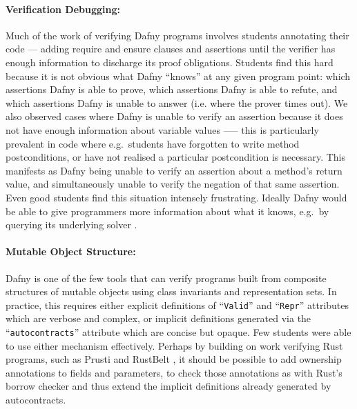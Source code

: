 \paragraph{Verification Debugging:}
Much of the work of verifying Dafny programs involves students
annotating their code --- adding require and ensure clauses and
assertions until the verifier has enough information to discharge its
proof obligations.  Students find this hard because it is not obvious
what Dafny “knows” at any given program point: which assertions Dafny
is able to prove, which assertions Dafny is able to refute, and which
assertions Dafny is unable to answer (i.e. where the prover times
out). We also observed cases where Dafny is unable to verify an
assertion because it does not have enough information about variable
values --— this is particularly prevalent in code where e.g.\ 
students have forgotten to write method postconditions, or 
have not realised a particular postcondition is necessary. This
manifests as Dafny being unable to verify an assertion about a
method’s return value, and simultaneously unable to verify the
negation of that same assertion.  Even good students find this
situation intensely frustrating.  Ideally Dafny would be able to give
programmers more information about what it knows, e.g.\
by querying its underlying solver \cite{Christakis2016}.




\paragraph{Mutable Object Structure:}  Dafny is one of the few tools
that can verify programs built from composite structures of mutable
objects using class invariants and representation sets.  In practice,
this requires either explicit definitions of ``\lstinline+Valid+'' and
``\lstinline+Repr+'' attributes \cite{dafny2020} which are verbose and
complex, or implicit definitions generated via the
``\lstinline+autocontracts+'' attribute \cite{leino2013} which are
concise but opaque.  Few students were able to use either mechanism
effectively.  Perhaps by building on work verifying Rust programs,
such as Prusti \cite{Astrauskas2019} and RustBelt \cite{Jung2017}, it
should be possible to add ownership annotations to fields and
parameters, to check those annotations as with Rust's borrow checker
\cite{Markstrum2010,Dietl2011,Klabnik2019} and thus extend the
implicit definitions already generated by autocontracts.

\vspace*{5mm}

